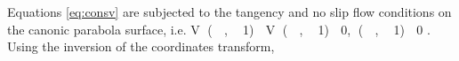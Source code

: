\documentclass{article}
\begin{document}
Equations \ref{eq:consv} are subjected to the tangency and no slip flow conditions on the canonic parabola surface, i.e. V (  ,  1)  V (  ,  1)  0, (  ,  1)  0 . Using the inversion of the coordinates transform,  
\end{document}
